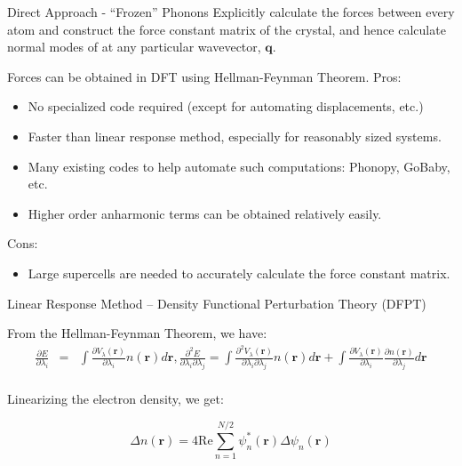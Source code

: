 \documentclass[aspectratio=169]{beamer}
\let \vec \mathbf
\begin{document}
    \begin{frame}{Direct Approach - ``Frozen'' Phonons}
        Explicitly calculate the forces between every atom and construct the force constant matrix of the crystal, and hence calculate normal modes of at any particular wavevector, $\vec{q}$. \newline
        \newline

        Forces can be obtained in DFT using Hellman-Feynman Theorem.\newline
        \newline
        Pros:
        \begin{itemize}
            \item No specialized code required (except for automating displacements, etc.)
            \item Faster than linear response method, especially for reasonably sized systems.
            \item Many existing codes to help automate such computations: Phonopy, GoBaby, etc.
            \item Higher order anharmonic terms can be obtained relatively easily.
        \end{itemize}

        Cons:
        \begin{itemize}
            \item Large supercells are needed to accurately calculate the force constant matrix.
        \end{itemize}

    \end{frame}

    \begin{frame}{Linear Response Method – Density Functional Perturbation Theory (DFPT)}

        From the Hellman-Feynman Theorem, we have:
        \begin{eqnarray*}
            \frac{\partial E}{\partial \lambda_i} & = & \int \frac{\partial V_{\lambda}(\vec{r})}{\partial \lambda_i} n(\vec{r}) d\vec{r}, \frac{\partial^2 E}{\partial \lambda_i \partial \lambda_j} = \int \frac{\partial^2 V_{\lambda}(\vec{r})}{\partial \lambda_i \partial \lambda_j} n(\vec{r}) d\vec{r} + \int \frac{\partial V_{\lambda}(\vec{r})}{\partial \lambda_i } \frac{ \partial n(\vec{r}) }{\partial \lambda_j} d\vec{r}\\
        \end{eqnarray*}

        Linearizing the electron density, we get:\cite{baroniPhononsRelatedCrystal2001}

        \begin{equation*}
            \Delta n(\vec{r}) = 4 \mathrm{Re} \sum_{n=1}^{N/2} \psi_n^*(\vec{r}) \Delta \psi_n(\vec{r})
        \end{equation*}
    \end{frame}
\end{document}
